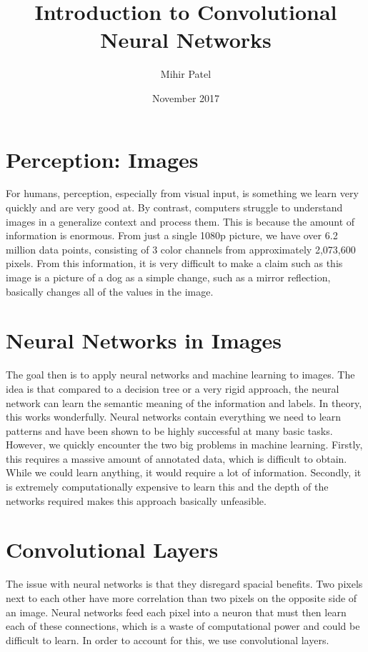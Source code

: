 \documentclass{article}
\title{Introduction to Convolutional Neural Networks}
\author{Mihir Patel}
\date{November 2017}
\begin{document}
\maketitle

\section{Perception: Images}
For humans, perception, especially from visual input, is something we learn very quickly and are very good at. By contrast, computers struggle to understand images in a generalize context and process them. This is because the amount of information is enormous. From just a single 1080p picture, we have over 6.2 million data points, consisting of 3 color channels from approximately 2,073,600 pixels. From this information, it is very difficult to make a claim such as this image is a picture of a dog as a simple change, such as a mirror reflection, basically changes all of the values in the image.

\section{Neural Networks in Images}
The goal then is to apply neural networks and machine learning to images. The idea is that compared to a decision tree or a very rigid approach, the neural network can learn the semantic meaning of the information and labels. In theory, this works wonderfully. Neural networks contain everything we need to learn patterns and have been shown to be highly successful at many basic tasks. However, we quickly encounter the two big problems in machine learning. Firstly, this requires a massive amount of annotated data, which is difficult to obtain. While we could learn anything, it would require a lot of information. Secondly, it is extremely computationally expensive to learn this and the depth of the networks required makes this approach basically unfeasible.

\section{Convolutional Layers}
The issue with neural networks is that they disregard spacial benefits. Two pixels next to each other have more correlation than two pixels on the opposite side of an image. Neural networks feed each pixel into a neuron that must then learn each of these connections, which is a waste of computational power and could be difficult to learn. In order to account for this, we use convolutional layers.
\end{document}
